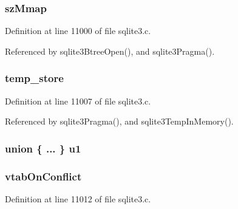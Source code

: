 \hypertarget{structsqlite3_a713ce873f3517b4e81a2652b84f4b355}{}
\subsubsection[{sz\+Mmap}]{ sz\+Mmap}\label{structsqlite3_a713ce873f3517b4e81a2652b84f4b355}


Definition at line 11000 of file sqlite3.\+c.



Referenced by sqlite3\+Btree\+Open(), and sqlite3\+Pragma().

\hypertarget{structsqlite3_aba8ed6678dba7fb1b7a2096f3364d0e0}{}
\subsubsection[{temp\+\_\+store}]{ temp\+\_\+store}\label{structsqlite3_aba8ed6678dba7fb1b7a2096f3364d0e0}


Definition at line 11007 of file sqlite3.\+c.



Referenced by sqlite3\+Pragma(), and sqlite3\+Temp\+In\+Memory().

\hypertarget{structsqlite3_a32f168810c164a910503efc81e6e5db6}{}
\subsubsection[{u1}]{\setlength{\rightskip}{0pt plus 5cm}union \{ ... \}   u1}\label{structsqlite3_a32f168810c164a910503efc81e6e5db6}
\hypertarget{structsqlite3_ae9f4bb219530defeffc8df2b7f3d79a7}{}
\subsubsection[{vtab\+On\+Conflict}]{ vtab\+On\+Conflict}\label{structsqlite3_ae9f4bb219530defeffc8df2b7f3d79a7}


Definition at line 11012 of file sqlite3.\+c.



